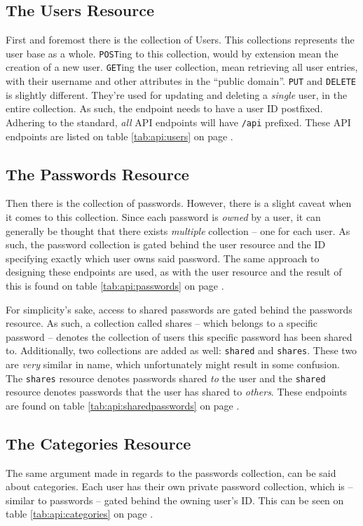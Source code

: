 		\subsection{The Users Resource}
			First and foremost there is the collection of Users. This collections represents the user base as a whole. \verb=POST=ing to this collection, would by extension mean the creation of a new user. \verb=GET=ing the user collection, mean retrieving all user entries, with their username and other attributes in the ``public domain''. \verb=PUT= and \verb=DELETE= is slightly different. They're used for updating and deleting a \emph{single} user, in the entire collection. As such, the endpoint needs to have a user ID postfixed. Adhering to the standard, \emph{all} API endpoints will have \verb=/api= prefixed. These API endpoints are listed on table \ref{tab:api:users} on page \pageref{tab:api:users}.

		\subsection{The Passwords Resource}
			Then there is the collection of passwords. However, there is a slight caveat when it comes to this collection. Since each password is \emph{owned} by a user, it can generally be thought that there exists \emph{multiple} collection -- one for each user. As such, the password collection is gated behind the user resource and the ID specifying exactly which user owns said password. The same approach to designing these endpoints are used, as with the user resource and the result of this is found on table \ref{tab:api:passwords} on page \pageref{tab:api:passwords}.

			For simplicity's sake, access to shared passwords are gated behind the passwords resource. As such, a collection called shares -- which belongs to a specific password -- denotes the collection of users this specific password has been shared to. Additionally, two collections are added as well: \verb=shared= and \verb=shares=. These two are  \emph{very} similar in name, which unfortunately might result in some confusion. The \verb=shares= resource denotes passwords shared \emph{to} the user and the \verb=shared= resource denotes passwords that the user has shared to \emph{others}. These endpoints are found on table \ref{tab:api:sharedpasswords} on page \pageref{tab:api:sharedpasswords}.

		\subsection{The Categories Resource}
			The same argument made in regards to the passwords collection, can be said about categories. Each user has their own private password collection, which is -- similar to passwords -- gated behind the owning user's ID. This can be seen on table \ref{tab:api:categories} on page \pageref{tab:api:categories}.

